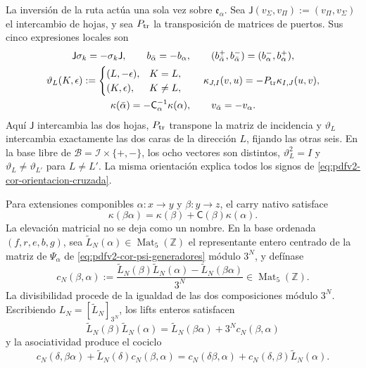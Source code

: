 La inversión de la ruta actúa una sola vez sobre
\(\mathfrak e_\alpha\). Sea
\(\mathsf J(v_\Sigma,v_\Pi):=(v_\Pi,v_\Sigma)\) el intercambio de hojas,
y sea \(P_{\rm tr}\) la transposición de matrices de puertos. Sus cinco
expresiones locales son
\begin{equation}
\label{eq:pdfv2-cor-orientacion-cruzada}
 \begin{gathered}
 \mathsf J\sigma_k=-\sigma_k\mathsf J,
 \qquad b_{\bar\alpha}=-b_\alpha,
 \qquad (b_{\bar\alpha}^+,b_{\bar\alpha}^-)
       =(b_\alpha^-,b_\alpha^+),\\
 \vartheta_L(K,\epsilon):=
 \begin{cases}
  (L,-\epsilon),&K=L,\\
  (K,\epsilon),&K\neq L,
 \end{cases}
 \qquad
 \kappa_{J,I}(v,u)=-P_{\rm tr}\kappa_{I,J}(u,v),\\
 \kappa(\bar\alpha)
 =-\mathsf C_\alpha^{-1}\kappa(\alpha),
 \qquad v_{\bar\alpha}=-v_\alpha.
 \end{gathered}
\end{equation}
Aquí \(\mathsf J\) intercambia las dos hojas, \(P_{\rm tr}\) transpone la matriz de
incidencia y \(\vartheta_L\) intercambia exactamente las dos caras de la
dirección \(L\), fijando las otras seis. En la base libre de
\(\mathscr B=\mathscr I\times\{+,-\}\), los ocho vectores son distintos,
\(\vartheta_L^2=I\) y
\(\vartheta_L\neq\vartheta_{L'}\) para \(L\neq L'\). La misma orientación
explica todos los signos de
\eqref{eq:pdfv2-cor-orientacion-cruzada}.

Para extensiones componibles \(\alpha:x\to y\) y \(\beta:y\to z\), el
carry nativo satisface
\begin{equation}
\label{eq:pdfv2-cor-carry-nativo}
 \kappa(\beta\alpha)=
 \kappa(\beta)+\mathsf C(\beta)\kappa(\alpha).
\end{equation}
La elevación matricial no se deja como un nombre. En la base ordenada
\((f,r,e,b,g)\), sea
\(\widetilde L_N(\alpha)\in\operatorname{Mat}_5(\mathbb Z)\) el
representante entero centrado de la matriz de
\(\Psi_\alpha\) de \eqref{eq:pdfv2-cor-psi-generadores} módulo \(3^N\), y
defínase
\begin{equation}
\label{eq:pdfv2-cor-carry-matricial-def}
 c_N(\beta,\alpha):=
 \frac{\widetilde L_N(\beta)\widetilde L_N(\alpha)
       -\widetilde L_N(\beta\alpha)}{3^N}
 \in\operatorname{Mat}_5(\mathbb Z).
\end{equation}
La divisibilidad procede de la igualdad de las dos composiciones módulo
\(3^N\). Escribiendo \(L_N=[\widetilde L_N]_{3^N}\), los lifts enteros
satisfacen
\begin{equation}
\label{eq:pdfv2-cor-carry-matricial}
 \widetilde L_N(\beta)\widetilde L_N(\alpha)
 =\widetilde L_N(\beta\alpha)+3^Nc_N(\beta,\alpha)
\end{equation}
y la asociatividad produce el cociclo
\begin{equation}
\label{eq:pdfv2-cor-cociclo-matricial}
 c_N(\delta,\beta\alpha)+\widetilde L_N(\delta)c_N(\beta,\alpha)
 =c_N(\delta\beta,\alpha)
  +c_N(\delta,\beta)\widetilde L_N(\alpha).
\end{equation}

